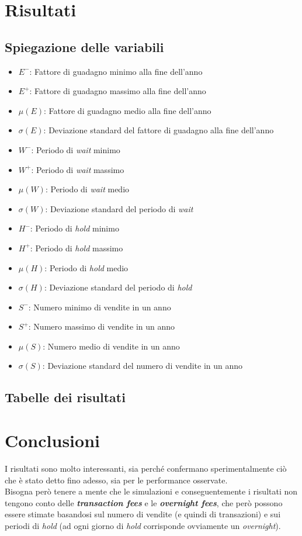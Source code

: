 \documentclass[binding=0.6cm]{sapthesis}
\begin{document}
		\section{Risultati}
			\subsection{Spiegazione delle variabili}
				\begin{itemize}
					\item $E^-$: Fattore di guadagno minimo alla fine dell'anno
					\item $E^+$: Fattore di guadagno massimo alla fine dell'anno
					\item $\mu(E)$: Fattore di guadagno medio alla fine dell'anno
					\item $\sigma(E)$: Deviazione standard del fattore di guadagno alla fine dell'anno
					\item $W^-$: Periodo di \textit{wait} minimo
					\item $W^+$: Periodo di \textit{wait} massimo
					\item $\mu(W)$: Periodo di \textit{wait} medio
					\item $\sigma(W)$: Deviazione standard del periodo di \textit{wait}
					\item $H^-$: Periodo di \textit{hold} minimo
					\item $H^+$: Periodo di \textit{hold} massimo
					\item $\mu(H)$: Periodo di \textit{hold} medio
					\item $\sigma(H)$: Deviazione standard del periodo di \textit{hold}
					\item $S^-$: Numero minimo di vendite in un anno
					\item $S^+$: Numero massimo di vendite in un anno
					\item $\mu(S)$: Numero medio di vendite in un anno
					\item $\sigma(S)$: Deviazione standard del numero di vendite in un anno
				\end{itemize}
			\subsection{Tabelle dei risultati}
				\label{sec:results}
				
		\section{Conclusioni}
			I risultati sono molto interessanti, sia perché confermano sperimentalmente ciò che è stato detto fino adesso, sia per le performance osservate. \\
			Bisogna però tenere a mente che le simulazioni e conseguentemente i risultati non tengono conto delle \textbf{\textit{transaction fees}} e le \textbf{\textit{overnight fees}}, che però possono essere
			stimate basandosi sul numero di vendite (e quindi di transazioni) e sui periodi di \textit{hold} (ad ogni giorno di \textit{hold} corrisponde ovviamente un \textit{overnight}). 
\end{document}
